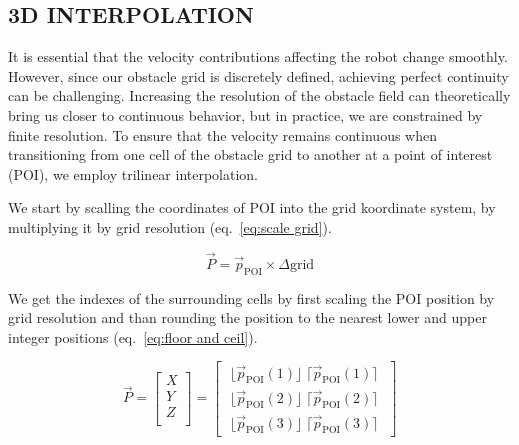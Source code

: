 \documentclass[letterpaper, 10 pt, conference]{ieeeconf}  %
\begin{document}

\subsection{3D INTERPOLATION} 


It is essential that the velocity contributions affecting the robot change smoothly. However, since our obstacle grid is discretely defined, achieving perfect continuity can be challenging. Increasing the resolution of the obstacle field can theoretically bring us closer to continuous behavior, but in practice, we are constrained by finite resolution. To ensure that the velocity remains continuous when transitioning from one cell of the obstacle grid to another at a point of interest (POI), we employ trilinear interpolation. 

We start by scalling the coordinates of POI into the grid koordinate system, by multiplying it by grid resolution (eq.~\ref{eq:scale grid}). 

\begin{equation}
	\label{eq:scale grid}
	\vec{P} = \vec{p}_{\mathrm{POI}} \times\Delta \mathrm{grid}
\end{equation}

We get the indexes of the surrounding cells by first scaling the POI position by grid resolution and than rounding the position to the nearest lower and upper integer positions (eq.~\ref{eq:floor and ceil}).

%
%

\begin{equation}
	\label{eq:floor and ceil}
	\vec{P} =
	\begin{bmatrix}
		X \\
		Y \\
		Z \\
	\end{bmatrix}
	=
	\begin{bmatrix}
		\; \lfloor \vec{p}_{\mathrm{POI}}(1) \rfloor \; \lceil \vec{p}_{\mathrm{POI}}(1) \rceil \;  \\
		\; \lfloor \vec{p}_{\mathrm{POI}}(2) \rfloor \; \lceil \vec{p}_{\mathrm{POI}}(2) \rceil \; \\
		\; \lfloor \vec{p}_{\mathrm{POI}}(3) \rfloor \; \lceil \vec{p}_{\mathrm{POI}}(3) \rceil \; 
	\end{bmatrix}
\end{equation}
\end{document}
